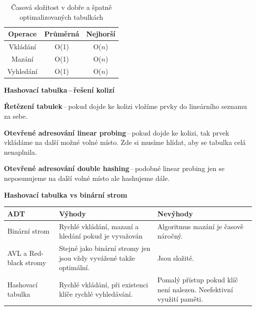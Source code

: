 \begin{table}[h]
    \centering
    \caption{Časová složitost v dobře a špatně optimalizovaných tabulkách}
    \begin{tabular}{|c|c|c|}
    \hline
         Operace & Průměrná & Nejhorší \\\hline
         Vkládání & O(1) & O($n$) \\\hline 
         Mazání & O(1) & O($n$) \\\hline
         Vyhledání & O(1) & O($n$) \\\hline
    \end{tabular}
\end{table}


\begin{Large}\vspace{0,2cm} \textbf{Hashovací tabulka\,--\,řešení kolizí}
\end{Large}

\textbf{Řetězení tabulek}\,--\,pokud dojde ke kolizi vložíme prvky do lineárního seznamu za sebe.

\textbf{Otevřené adresování linear probing}\,--\,pokud dojde ke kolizi, tak prvek vkládáme na další možné volné místo. Zde si musíme hlídat, aby se tabulka celá nenaplnila.

\textbf{Otevřené adresování double hashing}\,--\,podobné linear probing jen se neposunujeme na další volné místo ale hashujeme dále.

\begin{Large}\vspace{0,5cm} \textbf{Hashovací tabulka vs binární strom}
\end{Large}


\begin{table}[th]
    \begin{tabularx}{\textwidth}{|l|X|X|}
    \hline
         ADT & Výhody & Nevýhody \\\hline
         Binární strom & Rychlé vkládání, mazaní a hledání pokud je vyvažován & Algoritmus mazání je časově náročný. \\\hline
         AVL a Red-black stromy & Stejné jako binární stromy jen jsou vždy vyvážené takže optimální. & Jsou složité. \\\hline
         Hashovací tabulka & Rychlé vkládání, při existenci klíče rychlé vyhledávání. & Pomalý přístup pokud klíč není nalezen. Neefektivní využití paměti.\\\hline
    \end{tabularx}
\end{table}

